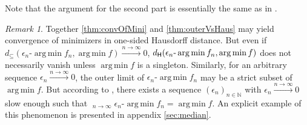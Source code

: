 \documentclass{scrartcl}
\renewcommand{\subset}{\subseteq}
\newcommand{\N}{\mathbb{N}}
\DeclareMathOperator*{\argmin}{arg\,min}
\DeclareMathOperator*{\outerlim}{lim\, \overline{sup}}
\theoremstyle{plain}\newtheorem{theorem}{Theorem}[section]
\theoremstyle{definition}
\theoremstyle{remark}
\newtheorem{remark}[theorem]{Remark}
\begin{document}
Note that the argument for the second part is essentially the same as in \cite[proof of Theorem A.4]{huckemann11}.
\begin{remark}\label{rem:epsilon_argmin}
Together \autoref{thm:convOfMini} and \autoref{thm:outerVsHaus} may yield convergence of minimizers in one-sided Hausdorff distance. But even if $d_{\subset}(\epsilon_n\text{-}\argmin f_n, \argmin f) \xrightarrow{n\to\infty} 0$, $d_\Haus(\epsilon_n\text{-}\argmin f_n, \argmin f)$ does not necessarily vanish unless $\argmin f$ is a singleton.
Similarly, for an arbitrary sequence $\epsilon_n \xrightarrow{n\to\infty}0$, the outer limit of $\epsilon_n\text{-}\argmin f_n$ may be a strict subset of $\argmin f$.
But according to \cite[Theorem 7.31 (c)]{rockafellar98}, there exists a sequence $(\epsilon_n)_{n\in\N}$ with $\epsilon_n\xrightarrow{n\to\infty}0$ slow enough such that $\outerlim_{n\to\infty}\epsilon_n\text{-}\argmin f_n = \argmin f$. An explicit example of this phenomenon is presented in appendix \ref{sec:median}.
\end{remark}
\end{document}
